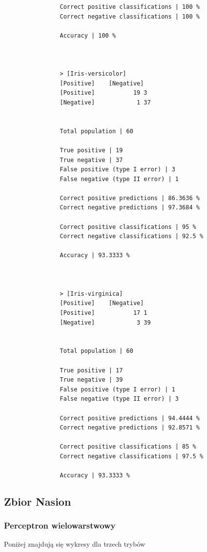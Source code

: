 \documentclass{classrep}
\begin{document}
{{{\begin{lstlisting}
                Correct positive classifications | 100 %
                Correct negative classifications | 100 %

                Accuracy | 100 %



                > [Iris-versicolor]
                [Positive]    [Negative]
                [Positive]           19 3
                [Negative]            1 37


                Total population | 60

                True positive | 19
                True negative | 37
                False positive (type I error) | 3
                False negative (type II error) | 1

                Correct positive predictions | 86.3636 %
                Correct negative predictions | 97.3684 %

                Correct positive classifications | 95 %
                Correct negative classifications | 92.5 %

                Accuracy | 93.3333 %



                > [Iris-virginica]
                [Positive]    [Negative]
                [Positive]           17 1
                [Negative]            3 39


                Total population | 60

                True positive | 17
                True negative | 39
                False positive (type I error) | 1
                False negative (type II error) | 3

                Correct positive predictions | 94.4444 %
                Correct negative predictions | 92.8571 %

                Correct positive classifications | 85 %
                Correct negative classifications | 97.5 %

                Accuracy | 93.3333 %

                \end{lstlisting}
            }
        }
        \subsection{Zbior Nasion}
        {
            \subsubsection{Perceptron wielowarstwowy}
            {
                Poniżej znajdują się wykresy dla trzech trybów

}}}
\end{document}
